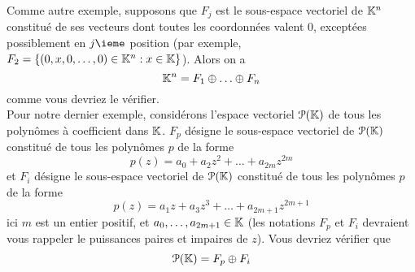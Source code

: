 \documentclass[12pt]{book}
\theoremstyle{plain}
\begin{document}
Comme autre exemple, supposons que $F_j$ est le sous-espace vectoriel de $\mathbb{K}^n$ constitué de ses vecteurs dont toutes les coordonnées valent 0, exceptées possiblement en $j\ieme$ position (par exemple, $F_2=\{(0,x,0,\ldots,0)\in\mathbb{K}^n:x\in\mathbb{K}\}$). Alors on a
\begin{equation*}
    \mathbb{K}^n=F_1\oplus\ldots\oplus F_n
\end{equation*}
comme vous devriez le vérifier.\\

Pour notre dernier exemple, considérons l'espace vectoriel $\mathcal{P}(\mathbb{K})$ de tous les polynômes à coefficient dans $\mathbb{K}$. $F_p$ désigne le sous-espace vectoriel de $\mathcal{P}(\mathbb{K})$ constitué de tous les polynômes $p$ de la forme
\begin{equation*}
    p(z)=a_0+a_2z^2+\ldots+a_{2m}z^{2m}
\end{equation*}
et $F_i$ désigne le sous-espace vectoriel de $\mathcal{P}(\mathbb{K})$ constitué de tous les polynômes $p$ de la forme
\begin{equation*}
    p(z)=a_1z+a_3z^3+\ldots+a_{2m+1}z^{2m+1}
\end{equation*}
ici $m$ est un entier positif, et $a_0,\ldots,a_{2m+1}\in\mathbb{K}$ (les notations $F_p$ et $F_i$ devraient vous rappeler le puissances paires et impaires de $z$). Vous devriez vérifier que
\begin{equation*}
    \mathcal{P}(\mathbb{K})=F_p\oplus F_i
\end{equation*}
\end{document}
